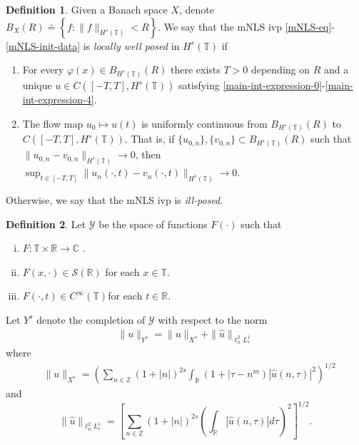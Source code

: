 \documentclass[12pt,reqno]{amsart}
\numberwithin{equation}{section}  %
\numberwithin{figure}{section}
\newcommand{\rr}{\mathbb{R}}
\newcommand{\zz}{\mathbb{Z}}
\newcommand{\cc}{\mathbb{C}}
\newcommand{\ci}{\mathbb{T}}
\newcommand{\wh}{\widehat}
\newcommand{\vp}{\varphi}
\theoremstyle{plain}
\theoremstyle{definition}
\newtheorem{definition}{Definition}
\theoremstyle{remark}
\begin{document}
\begin{definition}
  Given a Banach space $X$, denote $B_{X}(R) \doteq \left\{ f: \| f \|_{H^{s}(\ci)} < R
      \right\}$. We say that the mNLS ivp \eqref{mNLS-eq}-\eqref{mNLS-init-data} is
	\emph{locally well posed} in
	$H^s(\ci)$ if 
	\begin{enumerate}
    \item For every $\vp(x) \in B_{H^{s}(\ci)}(R)$
      there exists $T>0$ depending on $R$ and a unique $u \in C([-T,
      T], H^s(\ci))$ satisfying
      \eqref{main-int-expression-0}-\eqref{main-int-expression-4}.
    \item
      The flow map $u_0 \mapsto u(t)$ is uniformly continuous from
      $B_{H^{s}(\ci)}(R)$ 
      to $C(\left[ -T, T \right], H^s(\ci))$. That is, if
      $\{u_{0,n} \}, \{v_{0,n}\} \subset B_{H^{s}(\ci)}(R)$ such that $\|u_{0,n} -
      v_{0,n} \|_{H^{s}(\ci)} \to 0$, then \\
      $\sup_{t \in [-T, T]}
      \|u_{n}(\cdot, t) - v_{n}(\cdot, t) \|_{H^s(\ci)} \to 0$.
  \end{enumerate}
	Otherwise, we say that the mNLS ivp is \emph{ill-posed}.
\end{definition}
%
\begin{definition}
  Let $\mathcal{Y}$ be the space of functions $F(\cdot)$ such that
  \begin{enumerate}[(i)]
   \item{$F: \ci \times \rr \to \cc$ }.
   \item{ $F(x, \cdot) \in \mathcal{S}(\rr)$ for each $x \in \ci$}.
   \item{ $F(\cdot, t) \in C^{\infty}(\ci)$for each $t \in \rr$}.
  \end{enumerate}
  Let $Y^{s}$ denote the completion of $\mathcal{Y}$ with
  respect to the norm
  \begin{equation}
	\label{Y-s-norm}
	\begin{split}
		\|u\|_{Y^s} = \|u\|_{X^s} + \|\wh{u}\|_{ \ell^2_n L^1_\tau }
	\end{split}
\end{equation}
    where
\begin{equation}
	\label{X^s-norm}
	\begin{split}
		& \|u\|_{X^s}
		= \left ( \sum_{n\in \zz} \left (1 + |n| \right )^{2s} \int_\rr \left ( 1 + | 
		\tau - n^{m } \right ) | \wh{u} ( n, \tau ) |^2
		\right )^{1/2}
	\end{split}
\end{equation}
and
%
%
\begin{equation}
	\label{E-norm}
	\|\wh{u}\|_{ \ell^2_n L^1_\tau } = \left[ \sum_{n \in \zz}(1 + | n |)^{2s} \left(
	\int_{\rr}| \wh{u}(n, \tau) |d \tau \right)^{2} \right]^{1/2}.
\end{equation}
  \end{definition}
\end{document}
